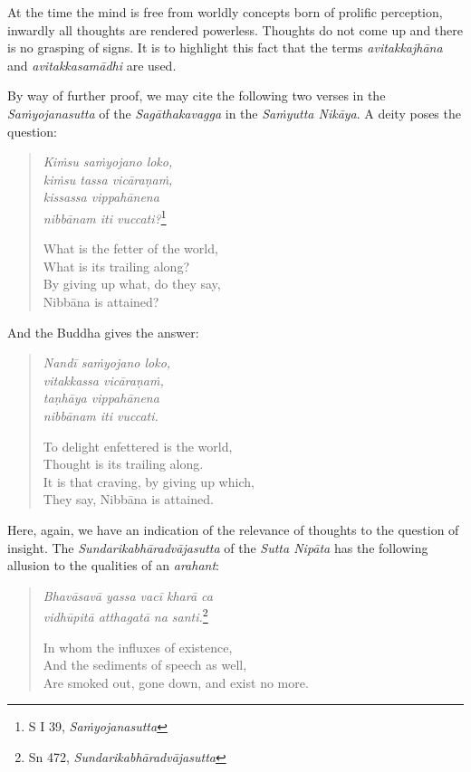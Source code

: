 At the time the mind is free from worldly concepts born of prolific perception, inwardly all thoughts are rendered powerless. Thoughts do not come up and there is no grasping of signs. It is to highlight this fact that the terms \emph{avitakkajhāna} and \emph{avitakkasamādhi} are used.

By way of further proof, we may cite the following two verses in the \emph{Saṁyojanasutta} of the \emph{Sagāthakavagga} in the \emph{Saṁyutta Nikāya}. A deity poses the question:

\begin{quote}
\emph{Kiṁsu saṁyojano loko,}\\
\emph{kiṁsu tassa vicāraṇaṁ,}\\
\emph{kissassa vippahānena}\\
\emph{nibbānam iti vuccati?}\footnote{S I 39, \emph{Saṁyojanasutta}}

What is the fetter of the world,\\
What is its trailing along?\\
By giving up what, do they say,\\
Nibbāna is attained?
\end{quote}

And the Buddha gives the answer:

\begin{quote}
\emph{Nandī saṁyojano loko,}\\
\emph{vitakkassa vicāraṇaṁ,}\\
\emph{taṇhāya vippahānena}\\
\emph{nibbānam iti vuccati.}

To delight enfettered is the world,\\
Thought is its trailing along.\\
It is that craving, by giving up which,\\
They say, Nibbāna is attained.
\end{quote}

Here, again, we have an indication of the relevance of thoughts to the question of insight. The \emph{Sundarikabhāradvājasutta} of the \emph{Sutta Nipāta} has the following allusion to the qualities of an \emph{arahant}:

\clearpage

\begin{quote}
\emph{Bhavāsavā yassa vacī kharā ca}\\
\emph{vidhūpitā atthagatā na santi.}\footnote{Sn 472, \emph{Sundarikabhāradvājasutta}}

In whom the influxes of existence,\\
And the sediments of speech as well,\\
Are smoked out, gone down, and exist no more.
\end{quote}

